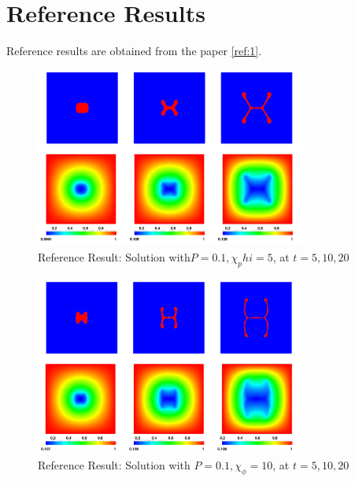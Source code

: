 \documentclass[12pt]{article}
\begin{document}
\section*{Reference Results}
Reference results are obtained from the paper \ref{ref:1}. 
\begin{figure}[h]
    \centering
    \includegraphics[width=0.8\textwidth]{figures/refRes1.png}
    \caption{Reference Result: Solution with$ P=0.1, \chi_phi=5$, at $t=5, 10, 20$}
    \label{fig:refRes1}
\end{figure}
\begin{figure}[h]
    \centering
    \includegraphics[width=0.8\textwidth]{figures/refRes2.png}
    \caption{Reference Result: Solution with $P=0.1, \chi_{\phi}=10$, at $t=5, 10, 20$}
    \label{fig:refRes2}
\end{figure}
\end{document}
